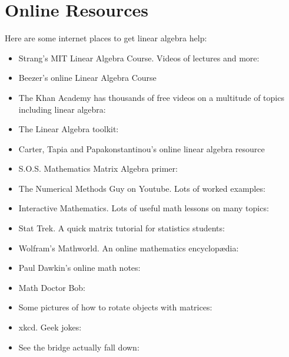 \chapter{Online Resources}\label{othersources}

Here are some  internet places to get linear algebra help:

\begin{itemize}
\item
Strang's MIT Linear Algebra Course. Videos of lectures and more:
\item Beezer's online Linear Algebra Course
\item The Khan Academy has thousands of free videos on a multitude of topics including linear algebra:
\item The Linear Algebra toolkit:
\item Carter, Tapia and Papakonstantinou's online linear algebra resource
\item
S.O.S. Mathematics Matrix Algebra primer:
\item The Numerical Methods Guy on Youtube. Lots of worked examples:
\item Interactive Mathematics. Lots of useful math lessons on many topics:
\item Stat Trek. A quick matrix tutorial for statistics students:
\item Wolfram's Mathworld. An online mathematics encyclop\ae dia:
\item Paul Dawkin's online math notes:
\item Math Doctor Bob:
\item Some pictures of how to rotate objects with matrices:
\item xkcd. Geek jokes:
\item See the bridge actually fall down:
\end{itemize}

\newpage